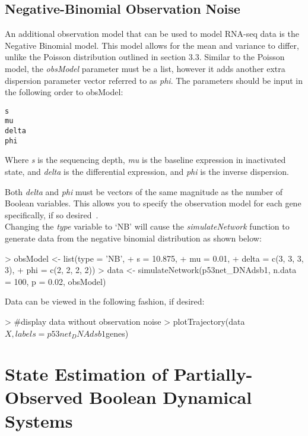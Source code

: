 \documentclass[a4paper]{article}
\theoremstyle{plain}
\theoremstyle{definition}
\theoremstyle{remark}
\begin{document}
\subsection{Negative-Binomial Observation Noise}

An additional observation model that can be used to model RNA-seq data is the Negative Binomial model. This model allows for the mean and variance to differ, unlike the Poisson distribution outlined in section 3.3. Similar to the Poisson model, the \textit{obsModel} parameter must be a list, however it adds another extra dispersion parameter vector referred to as \textit{phi}. The parameters should be input in the following order to obsModel:

\begin{verbatim}
s
mu
delta
phi
\end{verbatim}

Where \textit{s} is the sequencing depth, \textit{mu} is the baseline expression in inactivated state, and \textit{delta} is the differential expression, and \textit{phi} is the inverse dispersion.

Both \textit{delta} and \textit{phi} must be vectors of the same magnitude as the number of Boolean variables. This allows you to specify the observation model for each gene specifically, if so desired~\cite{ImanBrag:16b}. 
\\[1em]
Changing the \textit{type} variable to `NB' will cause the \textit{simulateNetwork} function to generate data from the negative binomial distribution as shown below: 

\begin{Schunk}
\begin{Sinput}
> obsModel <- list(type = 'NB', 
+                     s = 10.875, 
+                     mu = 0.01, 
+                  delta = c(3, 3, 3, 3), 
+                    phi = c(2, 2, 2, 2))
> data <- simulateNetwork(p53net_DNAdsb1, n.data = 100, p = 0.02, obsModel)
\end{Sinput}
\end{Schunk}
Data can be viewed in the following fashion, if desired:
\begin{Schunk}
\begin{Sinput}
> #display data without observation noise
> plotTrajectory(data$X, labels = p53net_DNAdsb1$genes)
\end{Sinput}
\end{Schunk}


\section{State Estimation of Partially-Observed Boolean Dynamical Systems}
\end{document}
